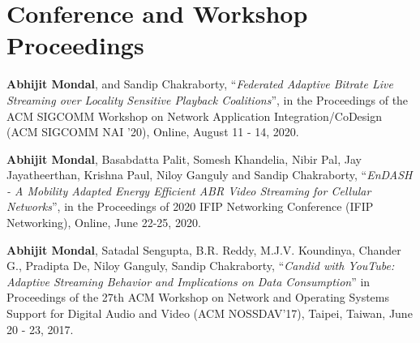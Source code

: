 \section*{Conference and Workshop Proceedings}
\begin{enumerate}[start=1,label={[\arabic*]}]
	\item \textbf{Abhijit Mondal}, and Sandip Chakraborty, ``\textit{Federated Adaptive Bitrate Live Streaming over Locality Sensitive Playback Coalitions}”, in the Proceedings of the ACM SIGCOMM Workshop on Network Application Integration/CoDesign (ACM SIGCOMM NAI '20), Online, August 11 - 14, 2020. 
	\item \textbf{Abhijit Mondal}, Basabdatta Palit, Somesh Khandelia, Nibir Pal, Jay Jayatheerthan, Krishna Paul, Niloy Ganguly and Sandip Chakraborty, ``\textit{EnDASH - A Mobility Adapted Energy Efficient ABR Video Streaming for Cellular Networks}'', in the Proceedings of 2020 IFIP Networking Conference (IFIP Networking), Online, June 22-25, 2020.
	\item \textbf{Abhijit Mondal}, Satadal Sengupta, B.R. Reddy, M.J.V. Koundinya, Chander G., Pradipta De, Niloy Ganguly, Sandip Chakraborty, ``\textit{Candid with YouTube: Adaptive Streaming Behavior and Implications on Data Consumption}'' in Proceedings of the 27th ACM Workshop on Network and Operating Systems Support for Digital Audio and Video (ACM NOSSDAV’17), Taipei, Taiwan, June 20 - 23, 2017.
\end{enumerate}
%
%
%
%




